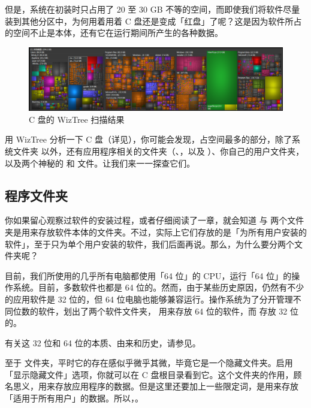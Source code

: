 但是，系统在初装时只占用了 20 至 30 GB 不等的空间，而即使我们将软件尽量装到其他分区中，为何用着用着 C 盘还是变成「红盘」了呢？这是因为软件所占的空间不止是本体，还有它在运行期间所产生的各种数据。

\begin{figure}[htb!]
  \centering
  \includegraphics[width=.9\textwidth]{assets/advanced/Scan_C_Drive.png}
  \caption{C 盘的 WizTree 扫描结果}
  \label{fig:Scan_C_Drive}
\end{figure}

用 WizTree 分析一下 C 盘（详见），你可能会发现，占空间最多的部分，除了系统文件夹  以外，还有应用程序相关的文件夹（、，以及 ）、你自己的用户文件夹，以及两个神秘的  和  文件。让我们来一一探查它们。

\subsection{程序文件夹}

你如果留心观察过软件的安装过程，或者仔细阅读了一章，就会知道  与  两个文件夹是用来存放软件本体的文件夹。不过，实际上它们存放的是「为所有用户安装的软件」，至于只为单个用户安装的软件，我们后面再说。那么，为什么要分两个文件夹呢？

目前，我们所使用的几乎所有电脑都使用「64 位」的 CPU，运行「64 位」的操作系统。目前，多数软件也都是 64 位的。然而，由于某些历史原因，仍然有不少的应用软件是 32 位的，但 64 位电脑也能够兼容运行。操作系统为了分开管理不同位数的软件，划出了两个软件文件夹， 用来存放 64 位的软件，而  存放 32 位的。

\begin{note}
  有关这 32 位和 64 位的本质、由来和历史，请参见。
\end{note}

至于  文件夹，平时它的存在感似乎微乎其微，毕竟它是一个隐藏文件夹。启用「显示隐藏文件」选项，你就可以在 C 盘根目录看到它。这个文件夹的作用，顾名思义，用来存放应用程序的数据。但是这里还要加上一些限定词，是用来存放「适用于所有用户」的数据。所以，。

